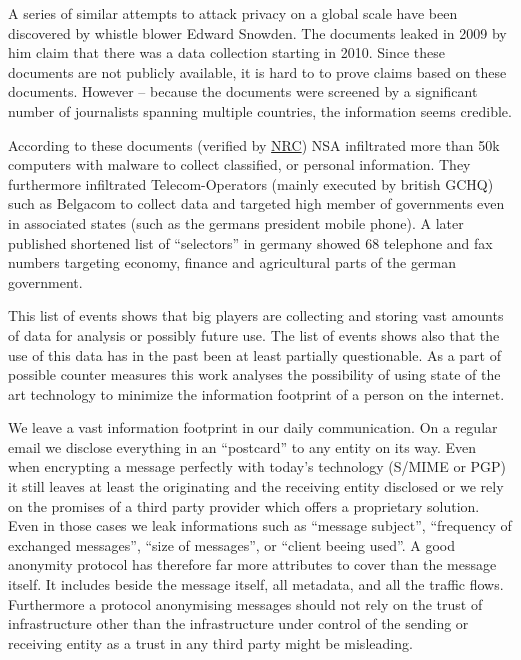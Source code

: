 A series of similar attempts to attack privacy on a global scale have been discovered by whistle blower Edward Snowden. The documents leaked in 2009 by him claim that there was a data collection starting in 2010. Since these documents are not publicly available, it is hard to to prove claims based on these documents. However -- because  the documents were screened by a significant number of journalists spanning multiple countries, the information seems credible.

According to these documents (verified by \href{http://www.nrc.nl/nieuws/2013/11/23/nederland-sinds-1946-doelwit-van-nsa}{NRC}) NSA infiltrated more than 50k computers with malware to collect classified, or personal information. They furthermore infiltrated Telecom-Operators (mainly executed by british GCHQ) such as Belgacom to collect data and targeted high member of governments even in associated states (such as the germans president mobile phone). A later published shortened list of ``selectors'' in germany showed 68 telephone and fax numbers targeting economy, finance and agricultural parts of the german government.

This list of events shows that big players are collecting and storing vast amounts of data for analysis or possibly future use. The list of events shows also that the use of this data has in the past been at least partially questionable. As a part of possible counter measures this work analyses the possibility of using state of the art technology to minimize the information footprint of a person on the internet. 

We leave a vast information footprint in our daily communication. On a regular email we disclose everything in an ``postcard'' to any entity on its way. Even when encrypting a message perfectly with today's technology (S/MIME\cite{RFC2045} or PGP\cite{RFC2015}) it still leaves at least the originating and the receiving entity disclosed or we rely on the promises of a third party provider which offers a proprietary solution. Even in those cases we leak informations such as ``message subject'', ``frequency of exchanged messages'', ``size of messages'', or ``client beeing used''. A good anonymity protocol has therefore far more attributes to cover than the message itself. It includes beside the message itself, all metadata, and all the traffic flows. Furthermore a protocol anonymising messages should not rely on the trust of infrastructure other than the infrastructure under control of the sending or receiving entity as a trust in any third party might be misleading.  

